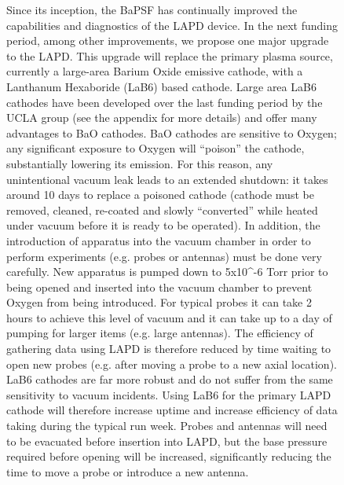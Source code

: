 \documentclass[11pt]{article}
\begin{document}
\begin{description}
\begin{figure}[!htbp]
Since its inception, the BaPSF has continually improved the capabilities
and diagnostics of the LAPD device. In the next funding period, among
other improvements, we propose one major upgrade to the LAPD. This
upgrade will replace the primary plasma source, currently a large-area
Barium Oxide emissive cathode, with a Lanthanum Hexaboride (LaB6) based
cathode. Large area LaB6 cathodes have been developed over the last
funding period by the UCLA group (see the appendix for more details) and
offer many advantages to BaO cathodes. BaO cathodes are sensitive to
Oxygen; any significant exposure to Oxygen will ``poison'' the cathode,
substantially lowering its emission. For this reason, any unintentional
vacuum leak leads to an extended shutdown: it takes around 10 days to
replace a poisoned cathode (cathode must be removed, cleaned, re-coated
and slowly ``converted'' while heated under vacuum before it is ready to
be operated). In addition, the introduction of apparatus into the vacuum
chamber in order to perform experiments (e.g. probes or antennas) must
be done very carefully. New apparatus is pumped down to 5x10\^{}-6 Torr
prior to being opened and inserted into the vacuum chamber to prevent
Oxygen from being introduced. For typical probes it can take 2 hours to
achieve this level of vacuum and it can take up to a day of pumping for
larger items (e.g. large antennas). The efficiency of gathering data
using LAPD is therefore reduced by time waiting to open new probes (e.g.
after moving a probe to a new axial location). LaB6 cathodes are far
more robust and do not suffer from the same sensitivity to vacuum
incidents. Using LaB6 for the primary LAPD cathode will therefore
increase uptime and increase efficiency of data taking during the
typical run week. Probes and antennas will need to be evacuated before
insertion into LAPD, but the base pressure required before opening will
be increased, significantly reducing the time to move a probe or
introduce a new antenna.


\end{figure}
\end{description}
\end{document}
